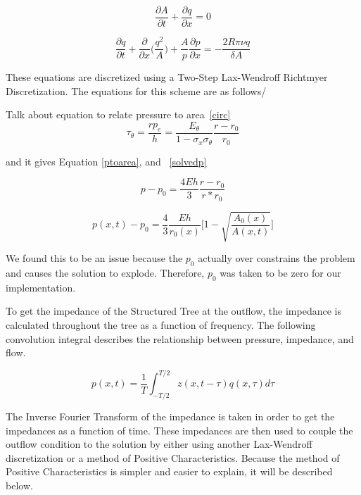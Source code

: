 \documentclass[12pt]{article}
\newcommand{\partder}[2]{\frac{\partial #1}{\partial #2}}
\begin{document}
\begin{equation}
	\label{continuity}
	\partder{A}{t} + \partder{q}{x} = 0
\end{equation}

\begin{equation}
	\label{consxmomentum}
	\partder{q}{t} + \partder{}{x}\Bigg(\frac{q^2}{A}\Bigg) + \frac{A}{p}\partder{p}{x} = -\frac{2R\pi \nu q}{\delta A}
\end{equation}

These equations are discretized using a Two-Step Lax-Wendroff Richtmyer Discretization. The equations for this scheme are as follows/

Talk about equation to relate pressure to area~\eqref{circ}
\begin{equation}
	\label{circ}
	\tau_\theta = \frac{r p_e}{h} = \frac{E_\theta}{1-\sigma_x\sigma_\theta}\frac{r-r_0}{r_0}
\end{equation}

and it gives Equation \eqref{ptoarea}, and ~\eqref{solvedp}

\begin{equation}
	\label{ptoarea}
	p-p_0 = \frac{4Eh}{3} \frac{r-r_0}{r*r_0}
\end{equation} 

\begin{equation}
	p(x,t) - p_0 = \frac{4}{3} \frac{Eh}{r_0(x)} \Bigg[1 - \sqrt{\frac{A_0(x)}{A(x,t)}}\Bigg]
	\label{solvedp}
\end{equation}

We found this to be an issue because the $p_0$ actually over constrains the problem and causes the solution to explode. Therefore, $p_0$ was taken to be zero for our implementation.\

To get the impedance of the Structured Tree at the outflow, the impedance is calculated throughout the tree as a function of frequency. The following convolution integral describes the relationship between pressure, impedance, and flow. 

\begin{equation}
p(x,t) = \frac{1}{T} \int_{-T/2}^{T/2} z(x,t-\tau) q(x,\tau) d\tau
\end{equation}

The Inverse Fourier Transform of the impedance is taken in order to get the impedances as a function of time. These impedances are then used to couple the outflow condition to the solution by either using another Lax-Wendroff discretization or a method of Positive Characteristics. Because the method of Positive Characteristics is simpler and easier to explain, it will be described below. 
\end{document}
